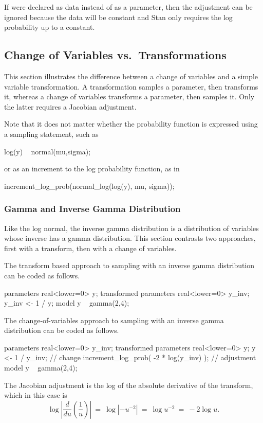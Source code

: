 If  were declared as data instead of as a parameter, then the
adjustment can be ignored because the data will be constant and Stan
only requires the log probability up to a constant.

\subsection{Change of Variables vs.\ Transformations}

This section illustrates the difference between a change of variables
and a simple variable transformation.  A transformation samples a
parameter, then transforms it, whereas a change of variables
transforms a parameter, then samples it.  Only the latter requires a
Jacobian adjustment.  

Note that it does not matter whether the probability function is
expressed using a sampling statement, such as
%
\begin{stancode}
log(y) ~ normal(mu,sigma);
\end{stancode}
%
or as an increment to the log probability function, as in
%
\begin{stancode}
increment_log_prob(normal_log(log(y), mu, sigma));
\end{stancode}

\subsubsection{Gamma and Inverse Gamma Distribution}\label{jacobian-adjustment.section}

Like the log normal, the inverse gamma distribution is a distribution
of variables whose inverse has a gamma distribution.  This section
contrasts two approaches, first with a transform, then with a change
of variables. 

The transform based approach to sampling  with an inverse
gamma distribution can be coded as follows.
%
\begin{stancode}
parameters {
  real<lower=0> y;
}
transformed parameters {
  real<lower=0> y_inv;   
  y_inv <- 1 / y;
}
model {
  y ~ gamma(2,4);
}
\end{stancode}
%
The change-of-variables approach to sampling  with an
inverse gamma distribution can be coded as follows.
%
\begin{stancode}
parameters {
  real<lower=0> y_inv;
}
transformed parameters {
  real<lower=0> y;
  y <- 1 / y_inv;                         // change
  increment_log_prob( -2 * log(y_inv) );  // adjustment
}
model {
  y ~ gamma(2,4);
}
\end{stancode}
%
The Jacobian adjustment is the log of the absolute derivative of the
transform, which in this case is
%
\[
\log \left| \frac{d}{du} \left( \frac{1}{u} \right) \right|
\ = \
\log | - u^{-2} |
\ = \
\log u^{-2}
\ = \
 -2 \log u.
\]


